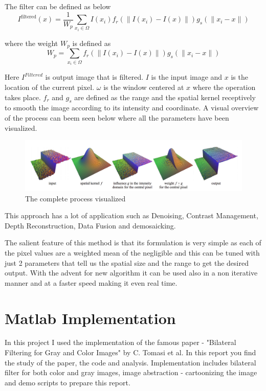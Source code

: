 \documentclass[12pt]{article}
\begin{document}
The filter can be defined as below
$$ I^\text{filtered}(x) = \frac{1}{W_p} \sum_{x_i \in \Omega} I(x_i)f_r(\|I(x_i)-I(x)\|)g_s(\|x_i-x\|)$$

where the weight $W_{p}$ is defined as 
$$ W_p = \sum_{x_i \in \Omega}{f_r(\|I(x_i)-I(x)\|)g_s(\|x_i-x\|)} $$

Here $I^{Filtered}$ is output image that is filtered.   $I$ is the input image and $x$ is the location of the current pixel.	$\omega$ is the window centered at $x$ where the operation takes place. $f_{r}$ and $g_{s}$ are defined as the range and the spatial kernel receptively to smooth the image according to its intensity and coordinate. A visual overview of the process can beem seen below where all the parameters have been visualized.

\begin{figure}[ht!]
\includegraphics[scale=0.24]{Overall.png}
\caption{The complete process visualized}
\end{figure}

This approach has a lot of application such as Denoising, Contrast Management, Depth Reconstruction, Data Fusion and demosaicking.	

The salient feature of this method is that its formulation is very simple as each of the pixel values are a weighted mean of the negligible and this can be tuned with just 2 parameters that tell us the spatial size and the range to get the desired output. With the advent for new algorithm it can be used also in a non iterative manner  and at a faster speed making it even real time.

	

\section{Matlab Implementation}
In this project I used the implementation of the famous paper - "Bilateral Filtering for Gray and Color Images" by C. Tomasi et al. In this report you find the study of the paper, the code and analysis. Implementation includes bilateral filter for both color and gray images, image abstraction - cartoonizing the image and demo scripts to prepare this report. 
\end{document}
